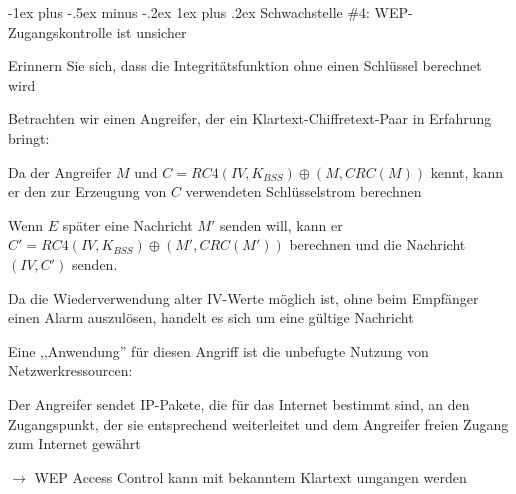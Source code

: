 \documentclass[a4paper]{article}
\makeatletter
\renewcommand{\subsubsection}{\@startsection{subsubsection}{3}{0mm}%
 {-1ex plus -.5ex minus -.2ex}%
 {1ex plus .2ex}%
 {\normalfont\small\bfseries}}
\makeatother
\begin{document}
\begin{multicols}{3}
      \subsubsection{Schwachstelle \#4: WEP-Zugangskontrolle ist unsicher}
      \begin{itemize*}
            \item Erinnern Sie sich, dass die Integritätsfunktion ohne einen Schlüssel berechnet wird
            \item Betrachten wir einen Angreifer, der ein Klartext-Chiffretext-Paar in Erfahrung bringt:
            \begin{itemize*}
                  \item Da der Angreifer $M$ und $C=RC4(IV, K_{BSS})\oplus (M, CRC(M))$ kennt, kann er den zur Erzeugung von $C$ verwendeten Schlüsselstrom berechnen
                  \item Wenn $E$ später eine Nachricht $M'$ senden will, kann er $C' = RC4(IV, K_{BSS})\oplus (M', CRC(M'))$ berechnen und die Nachricht $(IV, C')$ senden.
                  \item Da die Wiederverwendung alter IV-Werte möglich ist, ohne beim Empfänger einen Alarm auszulösen, handelt es sich um eine gültige Nachricht
                  \item Eine ,,Anwendung'' für diesen Angriff ist die unbefugte Nutzung von Netzwerkressourcen:
                  \begin{itemize*}
                        \item Der Angreifer sendet IP-Pakete, die für das Internet bestimmt sind, an den Zugangspunkt, der sie entsprechend weiterleitet und dem Angreifer freien Zugang zum Internet gewährt
                  \end{itemize*}
            \end{itemize*}
            \item[$\rightarrow$] WEP Access Control kann mit bekanntem Klartext umgangen werden
      \end{itemize*}


\end{multicols}
\end{document}
